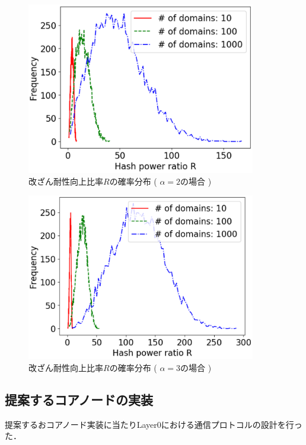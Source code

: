 \documentclass[a4paper,12pt]{jsarticle}
\begin{document}
%
\begin{figure}[th]%
  \begin{center}
    \includegraphics[width=100mm]{pht/hist-comp-R-alpha2.0-m1.0.eps}
  \end{center}
  \caption{改ざん耐性向上比率$R$の確率分布 ( $\alpha=2$の場合 ) }
  \label{fig:alpha2}
\end{figure}
%
%
\begin{figure}[H]%
  \begin{center}
    \includegraphics[width=100mm]{pht/hist-comp-R-alpha3.0-m1.0.eps}
  \end{center}
  \caption{改ざん耐性向上比率$R$の確率分布 ( $\alpha=3$の場合 ) }
  \label{fig:alpha3}
\end{figure}
%
\newpage
%

\subsection{提案するコアノードの実装}
提案するおコアノード実装に当たりLayer0における通信プロトコルの設計を行った．
\end{document}
